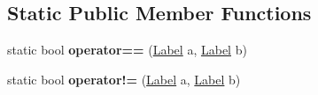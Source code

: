 \subsection*{Static Public Member Functions}
\begin{DoxyCompactItemize}
\item 
\mbox{\label{class_s_g_l_1_1_label_acfdcba6284f755436274b8b02497731e}} 
static bool {\bfseries operator==} (\mbox{\hyperlink{class_s_g_l_1_1_label}{Label}} a, \mbox{\hyperlink{class_s_g_l_1_1_label}{Label}} b)
\item 
\mbox{\label{class_s_g_l_1_1_label_a33d5c6719db459ad98648c6a57bef735}} 
static bool {\bfseries operator!=} (\mbox{\hyperlink{class_s_g_l_1_1_label}{Label}} a, \mbox{\hyperlink{class_s_g_l_1_1_label}{Label}} b)
\end{DoxyCompactItemize}
